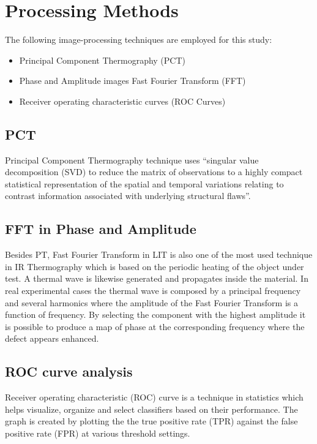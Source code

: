 \documentclass[]{spie}  %
\begin{document}


\section{Processing Methods} %
\label{sec:processing_methods}
The following image-processing techniques are employed for this study:
\begin{itemize}
   \item Principal Component Thermography (PCT)
   \item Phase and Amplitude images Fast Fourier Transform (FFT)
   \item Receiver operating characteristic curves (ROC Curves)
\end{itemize}

\subsection{PCT}
Principal Component Thermography technique\cite{Rajic2002} uses “singular value decomposition (SVD) to reduce the matrix of observations to a highly compact statistical representation of the spatial and temporal variations relating to contrast information associated with underlying structural flaws”.
\subsection{FFT in Phase and Amplitude}
Besides PT, Fast Fourier Transform in LIT\cite{wu1998lock} is also one of the most used technique in IR Thermography which is based on the periodic heating of the object under test. A thermal wave is likewise generated and propagates inside the material. In real experimental cases the thermal wave is composed by a principal frequency and several harmonics where the amplitude of the Fast Fourier Transform is a function of frequency. By selecting the component with the highest amplitude it is possible to produce a map of phase at the corresponding frequency where the defect appears enhanced.


\subsection{ROC curve analysis} %
\label{sub:roc_curve_analysis}
Receiver operating characteristic (ROC) curve is a technique in statistics which helps visualize, organize and select classifiers based on their performance\cite{Fawcett2006}. The graph is created by plotting the the true positive rate (TPR) against the false positive rate (FPR) at various threshold settings.
\end{document}

